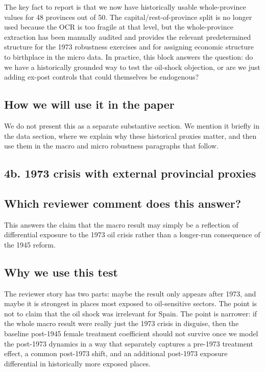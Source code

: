 \documentclass[11pt]{article}
\begin{document}
The key fact to report is that we now have historically usable whole-province values for 48 provinces out of 50. The capital/rest-of-province split is no longer used because the OCR is too fragile at that level, but the whole-province extraction has been manually audited and provides the relevant predetermined structure for the 1973 robustness exercises and for assigning economic structure to birthplace in the micro data. In practice, this block answers the question: do we have a historically grounded way to test the oil-shock objection, or are we just adding ex-post controls that could themselves be endogenous?

\subsection*{How we will use it in the paper}

We do not present this as a separate substantive section. We mention it briefly in the data section, where we explain why these historical proxies matter, and then use them in the macro and micro robustness paragraphs that follow.

\subsection*{4b. 1973 crisis with external provincial proxies}\label{sec:oilshock-4b}

\subsection*{Which reviewer comment does this answer?}

This answers the claim that the macro result may simply be a reflection of differential exposure to the 1973 oil crisis rather than a longer-run consequence of the 1945 reform.

\subsection*{Why we use this test}

The reviewer story has two parts: maybe the result only appears after 1973, and maybe it is strongest in places most exposed to oil-sensitive sectors. The point is not to claim that the oil shock was irrelevant for Spain. The point is narrower: if the whole macro result were really just the 1973 crisis in disguise, then the baseline post-1945 female treatment coefficient should not survive once we model the post-1973 dynamics in a way that separately captures a pre-1973 treatment effect, a common post-1973 shift, and an additional post-1973 exposure differential in historically more exposed places.
\end{document}
